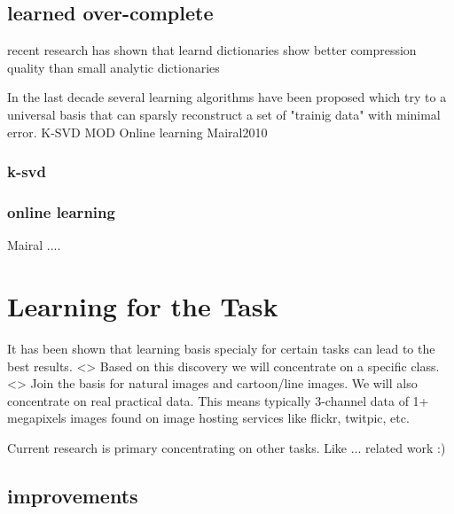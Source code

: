 \subsection{learned over-complete}
recent research has shown that learnd dictionaries show better compression quality than small analytic dictionaries \cite{Aharon2006} \cite{Chen1998} 


In the last decade several learning algorithms have been proposed which try to a universal basis that 
can sparsly reconstruct a set of "trainig data" with minimal error. 
K-SVD
MOD
Online learning
Mairal2010

\subsubsection{k-svd}
\subsubsection{online learning}
Mairal .... \cite{Mairal2010}

\section{Learning for the Task}
It has been shown that learning basis specialy for certain tasks can lead to the best results\cite{}.  <>
Based on this discovery we will concentrate on a specific class. <> Join the basis for natural images and cartoon/line images.
We will also concentrate on real practical data. This means typically 3-channel data of 1+ megapixels images found on image hosting services like flickr, twitpic, etc.

Current research is primary concentrating on other tasks. 
Like ... related work :)

\subsection{improvements}

